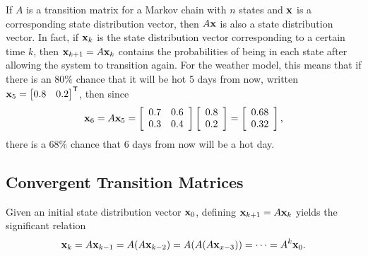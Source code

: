 If $A$ is a transition matrix for a Markov chain with $n$ states and $\mathbf{x}$ is a corresponding state distribution vector, then $A\mathbf{x}$ is also a state distribution vector.
In fact, if $\mathbf{x}_k$ is the state distribution vector corresponding to a certain time $k$, then $\mathbf{x}_{k+1} = A\mathbf{x}_k$ contains the probabilities of being in each state after allowing the system to transition again.
For the weather model, this means that if there is an $80\%$ chance that it will be hot 5 days from now, written $\mathbf{x}_{5} = \begin{bmatrix}0.8 & 0.2\end{bmatrix}^{\mathsf T}$, then since
\[
\mathbf{x}_{6} = A\mathbf{x}_{5} =
\left[\begin{array}{cc}
0.7 & 0.6 \\
0.3 & 0.4 \\
\end{array}\right]
\left[\begin{array}{c}0.8 \\ 0.2\end{array}\right]
=
\left[\begin{array}{c}0.68 \\ 0.32\end{array}\right],
\]
there is a $68\%$ chance that 6 days from now will be a hot day.

\subsection*{Convergent Transition Matrices} %

Given an initial state distribution vector $\mathbf{x}_{0}$, defining $\mathbf{x}_{k+1} = A\mathbf{x}_k$ yields the significant relation
\[
\mathbf{x}_k = A\mathbf{x}_{k-1} = A(A\mathbf{x}_{k-2}) = A(A(A\mathbf{x}_{x-3})) = \cdots = A^k\mathbf{x}_{0}.
\]


